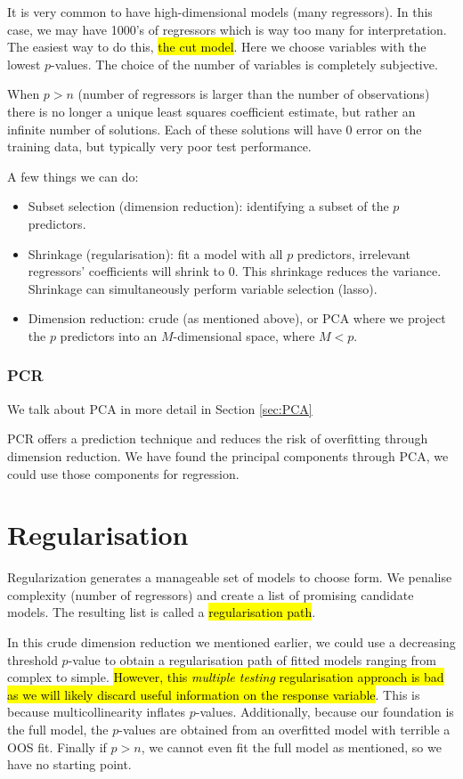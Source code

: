 \documentclass[11pt]{article}
\begin{document}
It is very common to have high-dimensional models (many regressors). In this case, we may have 1000's of regressors which is way too many for interpretation. The easiest way to do this, \hl{the cut model}. Here we choose variables with the lowest $p$-values. The choice of the number of variables is completely subjective.

\begin{note}
    When $p>n$ (number of regressors is larger than the number of observations) there is no longer a unique least squares coefficient estimate, but rather an infinite number of solutions. Each of these solutions will have 0 error on the training data, but typically very poor test performance. 
\end{note}

A few things we can do:
\begin{itemize}
    \item Subset selection (dimension reduction): identifying a subset of the $p$ predictors.
    \item Shrinkage (regularisation): fit a model with all $p$ predictors, irrelevant regressors' coefficients will shrink to 0. This shrinkage reduces the variance. Shrinkage can simultaneously perform variable selection (lasso).
    \item Dimension reduction: crude (as mentioned above), or PCA where we project the $p$ predictors into an $M$-dimensional space, where $M<p$.
\end{itemize}


\subsubsection{PCR}
We talk about PCA in more detail in Section \ref{sec:PCA}

PCR offers a prediction technique and reduces the risk of overfitting through dimension reduction. We have found the principal components through PCA, we could use those components for regression. 

\newpage
\section{Regularisation}

Regularization generates a manageable set of models to choose form. We penalise complexity (number of regressors) and create a list of promising candidate models. The resulting list is called a \hl{regularisation path}.

In this crude dimension reduction we mentioned earlier, we could use a decreasing threshold $p$-value to obtain a regularisation path of fitted models ranging from complex to simple. \hl{However, this \textit{multiple testing} regularisation approach is bad as we will likely discard useful information on the response variable}. This is because multicollinearity inflates $p$-values. Additionally, because our foundation is the full model, the $p$-values are obtained from an overfitted model with terrible a OOS fit. Finally if $p>n$, we cannot even fit the full model as mentioned, so we have no starting point.
\end{document}
